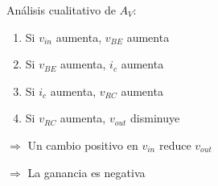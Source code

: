 \begin{frame}[t]
\begin{columns}
\begin{column}{0.6\textwidth}
            \vspace{5mm}

            Análisis cualitativo de $A_V$:

            \begin{enumerate}
                \item Si $v_{in}$ aumenta, $v_{BE}$ aumenta
                \item Si $v_{BE}$ aumenta, $i_c$ aumenta
                \item Si $i_c$ aumenta, $v_{RC}$ aumenta
                \item Si $v_{RC}$ aumenta, $v_{out}$ disminuye
            \end{enumerate}

            $\Rightarrow$ Un cambio positivo en $v_{in}$ reduce $v_{out}$

            $\Rightarrow$ La ganancia es negativa
        \end{column}
    \end{columns}
\end{frame}

